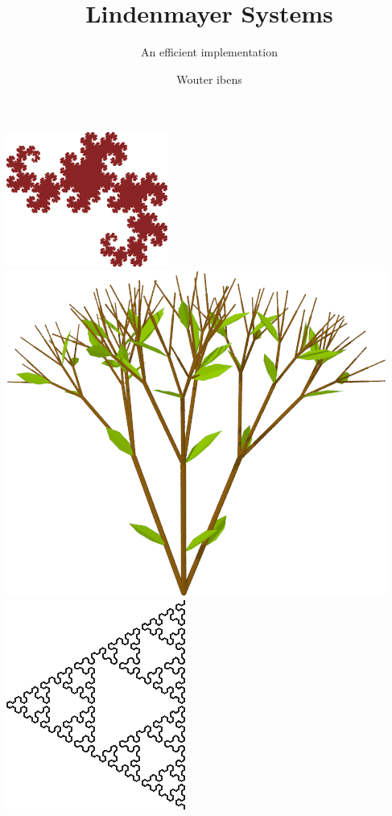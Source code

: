 \documentclass[ignorenonframetext,compress]{beamer}
\title{Lindenmayer Systems}
\subtitle{An efficient implementation}
\author{Wouter ibens}
\begin{document}

\begin{frame}[fragile]
	\frametitle{}
\begin{center}
\includegraphics[scale=0.5]{dragon.png}
\includegraphics[scale=0.3]{plant6.png}
\includegraphics[scale=0.4]{triangle.png}
\end{center}
\end{frame}
\end{document}
